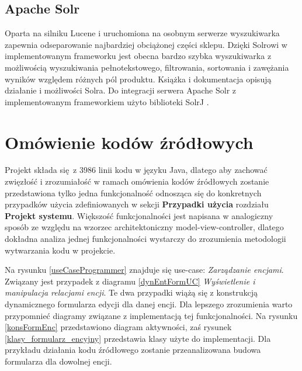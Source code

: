 \subsection{Apache Solr} 
Oparta na silniku Lucene i uruchomiona na osobnym serwerze wyszukiwarka zapewnia odseparowanie najbardziej obciążonej części sklepu. Dzięki Solrowi w implementowanym frameworku jest obecna bardzo szybka wyszukiwarka z możliwością wyszukiwania pełnotekstowego, filtrowania, sortowania i zawężania wyników względem różnych pól produktu. Książka \cite{solrbook} i dokumentacja \cite{Solr-doc} opisują działanie i możliwości Solra. Do integracji serwera Apache Solr z implementowanym frameworkiem użyto biblioteki SolrJ \cite{solrJ}.

\section{Omówienie kodów źródłowych}
Projekt składa się z 3986 linii kodu w języku Java, dlatego aby zachować zwięzłość i zrozumiałość w ramach omówienia kodów źródłowych zostanie przedstawiona tylko jedna funkcjonalność odnosząca się do konkretnych przypadków użycia zdefiniowanych w sekcji \textbf{Przypadki użycia} rozdziału \textbf{Projekt systemu}. Większość funkcjonalności jest napisana w analogiczny sposób ze względu na wzorzec architektoniczny model-view-controller, dlatego dokładna analiza jednej funkcjonalności wystarczy do zrozumienia metodologii wytwarzania kodu w projekcie. 

Na rysunku \ref{useCaseProgrammer} znajduje się use-case: \textit{Zarządzanie encjami}. Związany jest przypadek z diagramu \ref{dynEntFormUC} \textit{Wyświetlenie i manipulacja relacjami encji}.  Te dwa przypadki wiążą się z konstrukcją dynamicznego formularza edycji dla danej encji. Dla lepszego zrozumienia warto przypomnieć diagramy związane z implementacją tej funkcjonalności. Na rysunku \ref{konsFormEnc} przedstawiono diagram aktywności, zaś rysunek \ref{klasy_formularz_encyjny} przedstawia klasy użyte do implementacji. Dla przykładu działania kodu źródłowego zostanie przeanalizowana budowa formularza dla dowolnej encji.

